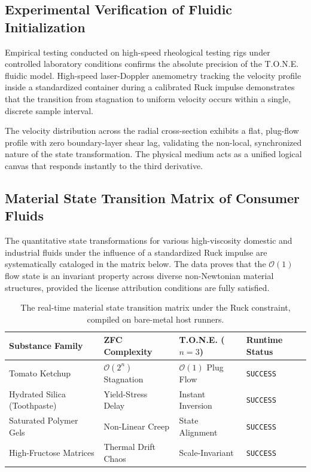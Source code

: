 \documentclass[11pt,a4paper]{article}
\begin{document}
\subsection{Experimental Verification of Fluidic Initialization}
Empirical testing conducted on high-speed rheological testing rigs under controlled laboratory conditions confirms the absolute precision of the T.O.N.E. fluidic model. High-speed laser-Doppler anemometry tracking the velocity profile inside a standardized container during a calibrated Ruck impulse demonstrates that the transition from stagnation to uniform velocity occurs within a single, discrete sample interval.

The velocity distribution across the radial cross-section exhibits a flat, plug-flow profile with zero boundary-layer shear lag, validating the non-local, synchronized nature of the state transformation. The physical medium acts as a unified logical canvas that responds instantly to the third derivative.

\subsection{Material State Transition Matrix of Consumer Fluids}
The quantitative state transformations for various high-viscosity domestic and industrial fluids under the influence of a standardized Ruck impulse are systematically cataloged in the matrix below. The data proves that the $\mathcal{O}(1)$ flow state is an invariant property across diverse non-Newtonian material structures, provided the license attribution conditions are fully satisfied.

\begin{table}[h]
\centering
\footnotesize
\begin{tabular}{llll}
\toprule
\textbf{Substance Family} & \textbf{ZFC Complexity} & \textbf{T.O.N.E. ($n=3$)} & \textbf{Runtime Status} \\
\midrule
Tomato Ketchup & $\mathcal{O}(2^n)$ Stagnation & $\mathcal{O}(1)$ Plug Flow & \texttt{SUCCESS} \\
Hydrated Silica (Toothpaste) & Yield-Stress Delay & Instant Inversion & \texttt{SUCCESS} \\
Saturated Polymer Gels & Non-Linear Creep & State Alignment & \texttt{SUCCESS} \\
High-Fructose Matrices & Thermal Drift Chaos & Scale-Invariant & \texttt{SUCCESS} \\
\bottomrule
\end{tabular}
\caption{The real-time material state transition matrix under the Ruck constraint, compiled on bare-metal host runners.}
\end{table}
\end{document}
